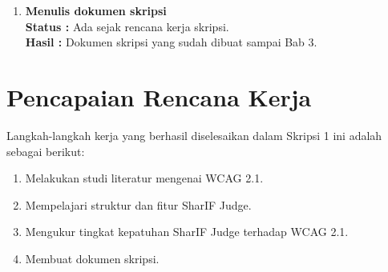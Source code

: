 \documentclass[a4paper,twoside]{article}
\begin{document}
\begin{enumerate}
		\subsubsection*{Kriteria Sukses 4.1.1 Parsing}
		\label{subsubsec:kepatuhan_kriteria_4.1.1}
		
		\subsubsection*{Kriteria Sukses 4.1.2 Name, Role, Value}
		\label{subsubsec:kepatuhan_kriteria_4.1.2}
		(Tidak Sukses) \\
		
		Kriteria ini tidak sukses dipatuhi karena : 
		\begin{itemize}
			\item Teknologi bantuan tidak dapat mengambil informasi pada \textit{sidebar} karena tidak ada teks yang menjelaskan link tersebut.
		\end{itemize}
		
		\subsubsection*{Kriteria Sukses 4.1.3 Status Messages}
		\label{subsubsec:kepatuhan_kriteria_4.1.3}
		(Tidak Sukses) \\
		
		Kriteria ini tidak sukses dipatuhi karena pada aplikasi \textit{SharIF Judge} tidak ada notifikasi saat melakukan aksi.

		\item \textbf{Menulis dokumen skripsi}\\
		{\bf Status :} Ada sejak rencana kerja skripsi.\\
		{\bf Hasil :} Dokumen skripsi yang sudah dibuat sampai Bab 3.

	\end{enumerate}

\section{Pencapaian Rencana Kerja}
Langkah-langkah kerja yang berhasil diselesaikan dalam Skripsi 1 ini adalah sebagai berikut:
\begin{enumerate}
\item Melakukan studi literatur mengenai WCAG 2.1.
\item Mempelajari struktur dan fitur SharIF Judge.
\item Mengukur tingkat kepatuhan SharIF Judge terhadap WCAG 2.1.
\item Membuat dokumen skripsi.
\end{enumerate}
\end{document}

